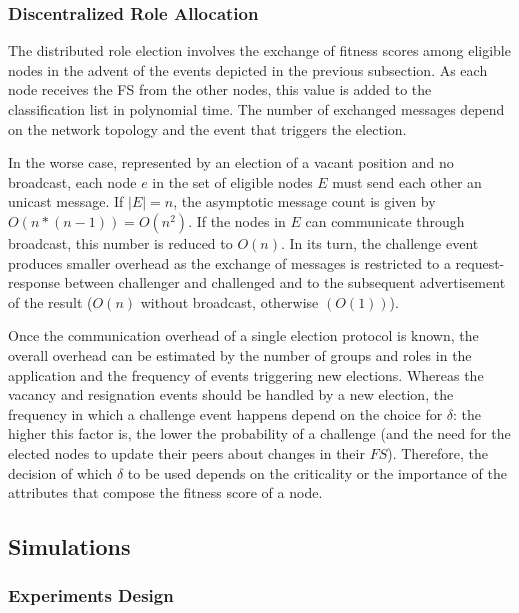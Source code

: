 \subsubsection{\textbf{Discentralized Role Allocation}} 


The distributed role election involves the exchange of fitness scores among eligible nodes in the advent of the events depicted in the previous subsection. As each node receives the FS from the other nodes, this value is added to the classification list in polynomial time. The number of exchanged messages depend on the network topology and the event that triggers the election. 

In the worse case, represented by an election of a vacant position and no broadcast, each node $e$ in the set of eligible nodes $E$ must send each other an unicast message. If $|E| = n$, the asymptotic message count is given by $O(n * (n-1)) = O(n^2)$. If the nodes in $E$ can communicate through broadcast, this number is reduced to $O(n)$. In its turn, the challenge event produces smaller overhead as the exchange of messages is restricted to a request-response between challenger and challenged and to the subsequent advertisement of the result ($O(n)$ without broadcast, otherwise $(O(1))$).

Once the communication overhead of a single election protocol is known, the overall overhead can be estimated by the number of groups and roles in the application and the frequency of events triggering new elections. Whereas the vacancy and resignation events should be handled by a new election, the frequency in which a challenge event happens depend on the choice for $\delta$: the higher this factor is, the lower the probability of a challenge (and the need for the elected nodes to update their peers about changes in their $FS$). Therefore, the decision of which $\delta$ to be used depends on the criticality or the importance of the attributes that compose the fitness score of a node. 



\subsection{Simulations}

\subsubsection{Experiments Design}


